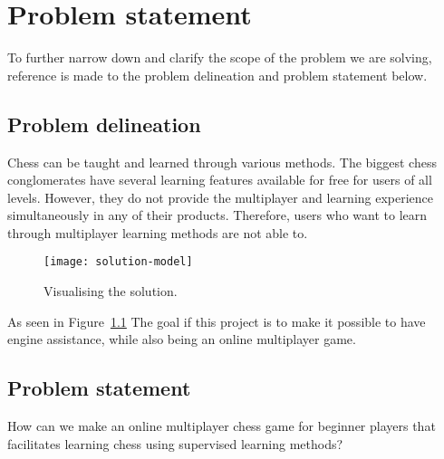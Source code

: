 \chapter{Problem statement}\label{ch:problem-statement}

To further narrow down and clarify the scope of the problem we are solving, reference is made to the problem delineation
and problem statement below.

\section{Problem delineation}\label{sec:problem-delineation}

Chess can be taught and learned through various methods.
The biggest chess conglomerates have several learning features available for free for users of all levels.
However, they do not provide the multiplayer and learning experience simultaneously in any of their products.
Therefore, users who want to learn through multiplayer learning methods are not able to.

\begin{figure}[htb]
    \centering
    \texttt{[image: solution-model]}
    \caption{Visualising the solution.}\label{fig:visualising-the-solution}
\end{figure}

As seen in Figure~\ref{fig:visualising-the-solution} The goal if this project is to make it possible to have engine
assistance, while also being an online multiplayer game.

\section{Problem statement}\label{sec:problem-statement}

How can we make an online multiplayer chess game for beginner players that facilitates learning chess using supervised
learning methods?
